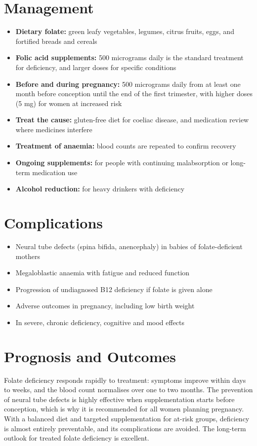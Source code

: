 \section*{Management}
\begin{itemize}
    \item \textbf{Dietary folate:} green leafy vegetables, legumes, citrus fruits, eggs, and fortified breads and cereals
    \item \textbf{Folic acid supplements:} 500 micrograms daily is the standard treatment for deficiency, and larger doses for specific conditions
    \item \textbf{Before and during pregnancy:} 500 micrograms daily from at least one month before conception until the end of the first trimester, with higher doses (5 mg) for women at increased risk
    \item \textbf{Treat the cause:} gluten-free diet for coeliac disease, and medication review where medicines interfere
    \item \textbf{Treatment of anaemia:} blood counts are repeated to confirm recovery
    \item \textbf{Ongoing supplements:} for people with continuing malabsorption or long-term medication use
    \item \textbf{Alcohol reduction:} for heavy drinkers with deficiency
\end{itemize}

\section*{Complications}
\begin{itemize}
    \item Neural tube defects (spina bifida, anencephaly) in babies of folate-deficient mothers
    \item Megaloblastic anaemia with fatigue and reduced function
    \item Progression of undiagnosed B12 deficiency if folate is given alone
    \item Adverse outcomes in pregnancy, including low birth weight
    \item In severe, chronic deficiency, cognitive and mood effects
\end{itemize}

\section*{Prognosis and Outcomes}
Folate deficiency responds rapidly to treatment: symptoms improve within days to weeks, and the blood count normalises over one to two months. The prevention of neural tube defects is highly effective when supplementation starts before conception, which is why it is recommended for all women planning pregnancy. With a balanced diet and targeted supplementation for at-risk groups, deficiency is almost entirely preventable, and its complications are avoided. The long-term outlook for treated folate deficiency is excellent.

